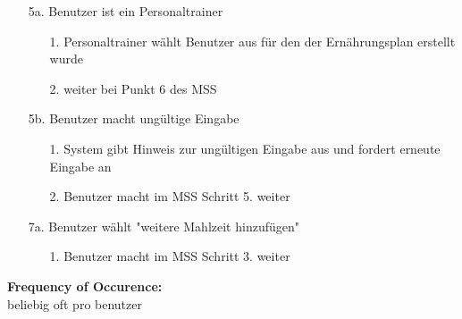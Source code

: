 \documentclass[12pt,a4paper,onecolumn]{article}
\begin{document}
\begin{enumerate}
    \item [5a.]  Benutzer ist ein Personaltrainer
    \begin{enumerate}
        \item[1.]Personaltrainer wählt Benutzer aus für den der \gls{Ernährungsplan} erstellt wurde
        \item[2.] weiter bei Punkt 6 des MSS
    \end{enumerate}
    \item [5b.]Benutzer macht ungültige Eingabe
    \begin{enumerate}
        \item[1.]System gibt Hinweis zur ungültigen Eingabe aus und fordert erneute Eingabe an
        \item[2.]Benutzer macht im MSS Schritt 5. weiter
    \end{enumerate}
    \item[7a.] Benutzer wählt "weitere Mahlzeit hinzufügen"
    \begin{enumerate}
        \item [1.]Benutzer macht im MSS Schritt 3. weiter
    \end{enumerate}
\end{enumerate}
\textbf{Frequency of Occurence:}\\beliebig oft pro benutzer \\
\end{document}
